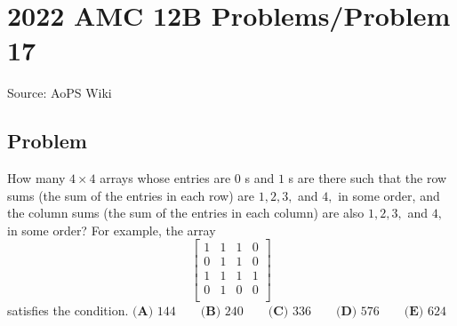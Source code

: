 \documentclass[12pt]{article}
\begin{document}
\section*{{2022 AMC 12B Problems/Problem 17}}
Source: AoPS Wiki

\subsection*{Problem}
How many $4 \times 4$ arrays whose entries are $0$ s and $1$ s are there such that the row sums (the sum of the entries in each row) are $1, 2, 3,$ and $4,$ in some order, and the column sums (the sum of the entries in each column) are also $1, 2, 3,$ and $4,$ in some order? For example, the array \[\left[ \begin{array}{cccc} 1 & 1 & 1 & 0 \\ 0 & 1 & 1 & 0 \\ 1 & 1 & 1 & 1 \\ 0 & 1 & 0 & 0 \\ \end{array} \right]\] satisfies the condition. $\textbf{(A) }144 \qquad \textbf{(B) }240 \qquad \textbf{(C) }336 \qquad \textbf{(D) }576 \qquad \textbf{(E) }624$
\end{document}
